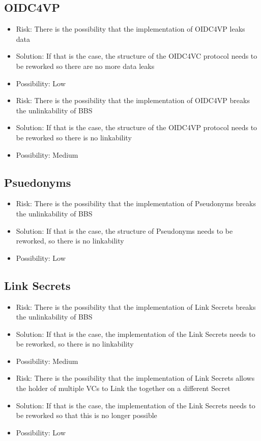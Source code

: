 \documentclass[
	a4paper               %
	,bibliography=totoc   %
	,listof=totoc         %
	,monolingual
	twoside=false,
]{bfhthesis}              %
\begin{document}
\subsection{OIDC4VP}
\begin{itemize}
	\item Risk: There is the possibility that the implementation of OIDC4VP leaks data
	\item Solution: If that is the case, the structure of the OIDC4VC protocol needs to be reworked so there are no more data leaks
	\item Possibility: Low
\end{itemize}
\begin{itemize}
	\item Risk: There is the possibility that the implementation of OIDC4VP breaks the unlinkability of BBS
	\item Solution: If that is the case, the structure of the OIDC4VP protocol needs to be reworked so there is no linkability
	\item Possibility: Medium
\end{itemize}

\subsection{Psuedonyms}
\begin{itemize}
	\item Risk: There is the possibility that the implementation of Pseudonyms breaks the unlinkability of BBS
	\item Solution: If that is the case, the structure of Pseudonyms needs to be reworked, so there is no linkability
	\item Possibility: Low
\end{itemize}

\subsection{Link Secrets}
\begin{itemize}
	\item Risk: There is the possibility that the implementation of Link Secrets breaks the unlinkability of BBS
	\item Solution: If that is the case, the implementation of the Link Secrets needs to be reworked, so there is no linkability
	\item Possibility: Medium
\end{itemize}
\begin{itemize}
	\item Risk: There is the possibility that the implementation of Link Secrets allows the holder of multiple VCs to Link the together on a different Secret
	\item Solution: If that is the case, the implementation of the Link Secrets needs to be reworked so that this is no longer possible
	\item Possibility: Low
\end{itemize}
\end{document}
